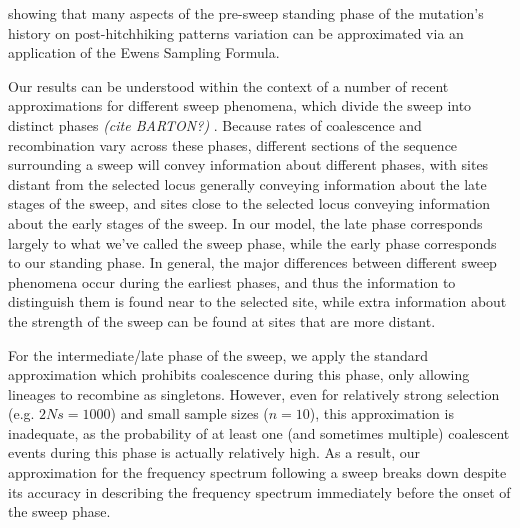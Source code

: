 \documentclass[a4paper,10pt]{article}
\newcommand{\jb}[1]{{\it\color{blue} (#1)} }
\begin{document}
showing that many aspects of the pre-sweep standing phase of the mutation's history on post-hitchhiking patterns variation can be approximated via an application of the Ewens Sampling Formula.

Our results can be understood within the context of a number of recent approximations for different sweep phenomena, which divide the sweep into distinct phases \jb{cite BARTON?}. Because rates of coalescence and recombination vary across these phases, different sections of the sequence surrounding a sweep will convey information about different phases, with sites distant from the selected locus generally conveying information about the late stages of the sweep, and sites close to the selected locus conveying information about the early stages of the sweep. In our model, the late phase corresponds largely to what we've called the sweep phase, while the early phase corresponds to our standing phase. In general, the major differences between different sweep phenomena occur during the earliest phases, and thus the information to distinguish them is found near to the selected site, while extra information about the strength of the sweep can be found at sites that are more distant.

For the intermediate/late phase of the sweep, we apply the standard approximation which prohibits coalescence during this phase, only allowing lineages to recombine as singletons. However, even for relatively strong selection (e.g. $2Ns = 1000$) and small sample sizes ($n = 10$), this approximation is inadequate, as the probability of at least one (and sometimes multiple) coalescent events during this phase is actually relatively high. As a result, our approximation for the frequency spectrum following a sweep breaks down despite its accuracy in describing the frequency spectrum immediately before the onset of the sweep phase.
\end{document}
